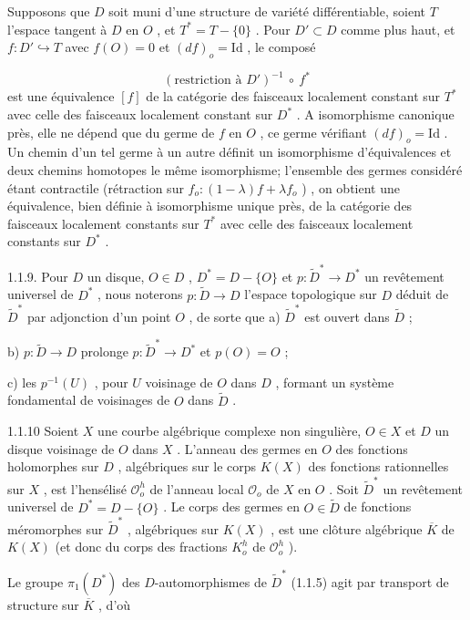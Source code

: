 Supposons que $D$ soit muni d'une structure de variété différentiable, soient $T$ l'espace tangent à $D$ en $O$ , et $T^{*} = T-\{0\}$ . Pour $D' \subset D$ comme plus haut, et $f : D' \hookrightarrow T$ avec $f(O) = 0$ et $(df)_{o} = \mathrm{Id}$ , le composé

\begin{equation*}
(\text{restriction à } D')^{-1} \ \circ \ f^{*}
\end{equation*}
est une équivalence $[f]$ de la catégorie des faisceaux localement constant sur $T^{*}$ avec celle des faisceaux localement constant sur $D^{*}$ . A isomorphisme canonique près, elle ne dépend que du germe de $f$ en $O$ , ce germe vérifiant $(df)_{o} = \mathrm{Id}$ . Un chemin d'un tel germe à un autre définit un isomorphisme d'équivalences et deux chemins homotopes le même isomorphisme; l'ensemble des germes considéré étant contractile (rétraction sur $f_{o} : (1-\lambda)f + \lambda f_{o}$ ) , on obtient une équivalence, bien définie à isomorphisme unique près, de la catégorie des faisceaux localement constants sur $T^{*}$ avec celle des faisceaux localement constants sur $D^{*}$ .

1.1.9. Pour $D$ un disque, $O \in D$ , $D^{*} = D-\{O\}$ et $p : \tilde{D}^{*} \to D^{*}$ un revêtement universel de $D^{*}$ , nous noterons $p : \tilde{D} \to D$ l'espace topologique sur $D$ déduit de $\tilde{D}^{*}$ par adjonction d'un point $O$ , de sorte que
a) $\widetilde{D}^*$ est ouvert dans $\widetilde{D}$ ;

b) $p : \widetilde{D} \to D$ prolonge $p : \widetilde{D}^* \to D^*$ et $p(O) = O$ ;

c) les $p^{-1}(U)$ , pour $U$ voisinage de $O$ dans $D$ , formant un système fondamental de voisinages de $O$ dans $\widetilde{D}$ .

1.1.10 Soient $X$ une courbe algébrique complexe non singulière, $O \in X$ et $D$ un disque voisinage de $O$ dans $X$ . L'anneau des germes en $O$ des fonctions holomorphes sur $D$ , algébriques sur le corps $K(X)$ des fonctions rationnelles sur $X$ , est l'hensélisé $\mathcal{O}_o^h$ de l'anneau local $\mathcal{O}_o$ de $X$ en $O$ . Soit $\widetilde{D}^*$ un revêtement universel de $D^* = D-\{O\}$ . Le corps des germes en $O \in \widetilde{D}$ de fonctions méromorphes sur $\widetilde{D}^*$ , algébriques sur $K(X)$ , est une clôture algébrique $\overline{K}$ de $K(X)$ (et donc du corps des fractions $K_o^h$ de $\mathcal{O}_o^h$ ).

Le groupe $\pi_1(D^*)$ des $D$-automorphismes de $\widetilde{D}^*$ (1.1.5) agit par transport de structure sur $\overline{K}$ , d'où

